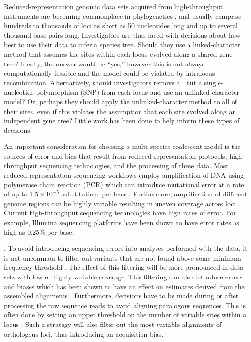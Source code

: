 Reduced-representation genomic data sets acquired from high-throughput
instruments are becoming commonplace in phylogenetics \citep{Leache2017}, and
usually comprise hundreds to thousands of loci as short as 50 nucleotides long
and up to several thousand base pairs long.
Investigators are thus faced with decisions about how best to 
use their data to infer a species tree.
Should they use a linked-character method that assumes the sites within each
locus evolved along a shared gene tree?
Ideally, the answer would be ``yes,'' however this is not always
computationally feasible and the model could be violated by intralocus
recombination.
Alternatively, should investigators remove all but a single-nucleotide
polymorphism (SNP) from each locus and use an unlinked-character model?
Or, perhaps they should apply the unlinked-character method to all of their
sites, even if this violates the assumption that each site evolved along an
independent gene tree?
Little work has been done to help inform these types of decisions. 

An important consideration for choosing a multi-species coalescent model is
the sources of error and bias that result from reduced-representation protocols,
high-throughput sequencing technologies, and the processing of these data.
Most reduced-representation sequencing workflows employ amplification of DNA  
using polymerase chain reaction (PCR) which can introduce mutational error at a 
rate of up to $1.5\times10^{-5}$ substitutions per base \citep{potapovExaminingSourcesError2017}.
Furthermore, amplification of different genome regions can be highly variable 
resulting in uneven coverage across loci \citep{airdAnalyzingMinimizingPCR2011}. 
Current high-throughput sequencing technologies have high rates of error.
For example, Illumina sequencing platforms have been shown to have error rates
as high as 0.25\% per base. 

\citep{pfeifferSystematicEvaluationError2018}. 
To avoid introducing sequencing errors into analyses performed with the data, it is not 
uncommon to filter out variants that are not found above some minimum frequency 
threshold \citep{rochetteStacksAnalyticalMethods2019, linckMinorAlleleFrequency2019}. 
The effect of this filtering will be more pronounced in data sets with low or 
highly variable coverage.
This filtering can also introduce errors and biases which has been 
shown to have an effect on estimates derived from the assembled alignments
\citep{Harvey2015,linckMinorAlleleFrequency2019}.
Furthermore, decisions have to be made during or after processing
the raw sequence reads to avoid aligning paralogous sequences.
This is often done by setting an upper threshold on the number of variable
sites within a locus \citep{harveySimilarityThresholdsUsed2015}. 
Such a strategy will also filter out the most variable alignments
of orthologous loci, thus introducing an acquisition bias.

